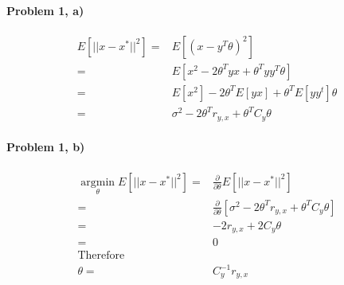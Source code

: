 \documentclass[11pt]{article}
\begin{document}
\MakeScribeTop


\paragraph{\noindent\textbf{\LARGE{Problem 1, a)}}}

\begin{equation*}
\begin{split}
    E[||x-x^*||^2]  = & E[(x -y^T\theta)^2] \\
                    = & E[x^2 - 2\theta^Tyx + \theta^T y y^T \theta] \\
                    = & E[x^2] -2\theta^T E[yx] + \theta^T E[y y^t] \theta \\
                    = & \sigma^2 - 2\theta^Tr_{y,x} + \theta^TC_y\theta
\end{split}
\end{equation*}


\paragraph{\noindent\textbf{\LARGE{Problem 1, b)}}}

\begin{equation*}
\begin{split}
    \operatorname*{argmin}_\theta E[||x-x^*||^2]  = & \frac{\partial}{\partial \theta}  E[||x-x^*||^2]\\
        = & \frac{\partial}{\partial \theta}  [\sigma^2 - 2\theta^Tr_{y,x} + \theta^TC_y\theta] \\
        = & - 2r_{y,x} + 2C_y\theta \\
        = & 0 \\
        \text{Therefore} & \\
    \theta = & C_y^{-1} r_{y,x} 
\end{split}
\end{equation*}

        
\end{document}
